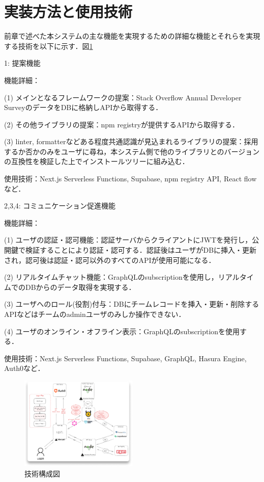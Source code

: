 \documentclass[main]{subfiles}
\begin{document}
\section{実装方法と使用技術}
前章で述べた本システムの主な機能を実現するための詳細な機能とそれらを実現する技術を以下に示す．図\ref{fig:techstack}

\textcircled{\scriptsize{1}}: 提案機能 \par
機能詳細：\par
(1) メインとなるフレームワークの提案：Stack Overﬂow Annual Developer SurveyのデータをDBに格納しAPIから取得する．\par
(2) その他ライブラリの提案：npm registryが提供するAPIから取得する．\par
(3) linter, formatterなどある程度共通認識が見込まれるライブラリの提案：採用するか否かのみをユーザに尋ね，本システム側で他のライブラリとのバージョンの互換性を検証した上でインストールツリーに組み込む．\par
使用技術：Next.js Serverless Functions, Supabase, npm registry API, React flowなど．\par

\textcircled{\scriptsize{2}},\textcircled{\scriptsize{3}},\textcircled{\scriptsize{4}}: コミュニケーション促進機能\par
機能詳細：\par
(1) ユーザの認証・認可機能：認証サーバからクライアントにJWTを発行し，公開鍵で検証することにより認証・認可する．認証後はユーザがDBに挿入・更新され，認可後は認証・認可以外のすべてのAPIが使用可能になる．\par
(2) リアルタイムチャット機能：GraphQLのsubscriptionを使用し，リアルタイムでのDBからのデータ取得を実現する．\par
(3) ユーザへのロール(役割)付与：DBにチームレコードを挿入・更新・削除するAPIなどはチームのadminユーザのみしか操作できない．\par
(4) ユーザのオンライン・オフライン表示：GraphQLのsubscriptionを使用する．\par
使用技術：Next.js Serverless Functions, Supabase, GraphQL, Hasura Engine, Auth0など．\par
\begin{figure}[h]
    \centering
    \includegraphics[keepaspectratio,width=0.5\textwidth]{../figures/techstack.png}
    \caption{技術構成図}
    \label{fig:techstack}
\end{figure}
\end{document}
